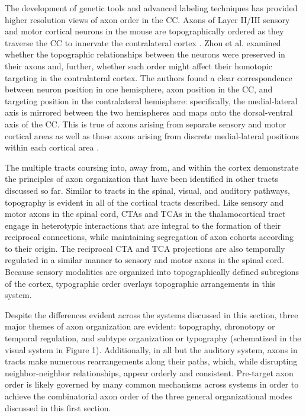 The development of genetic tools and advanced labeling techniques has provided higher resolution views of axon order in the CC. 
Axons of Layer II/III sensory and motor cortical neurons in the mouse are topographically ordered as they traverse the CC to innervate the contralateral cortex \cite{zhou2013axon}. 
Zhou et al. examined whether the topographic relationships between the neurons were preserved in their axons and, further, whether such order might affect their homotopic targeting in the contralateral cortex. 
The authors found a clear correspondence between neuron position in one hemisphere, axon position in the CC, and targeting position in the contralateral hemisphere: specifically, the medial-lateral axis is mirrored between the two hemispheres and maps onto the dorsal-ventral axis of the CC. 
This is true of axons arising from separate sensory and motor cortical areas as well as those axons arising from discrete medial-lateral positions within each cortical area \cite{zhou2013axon}. 

The multiple tracts coursing into, away from, and within the cortex demonstrate the principles of axon organization that have been identified in other tracts discussed so far. 
Similar to tracts in the spinal, visual, and auditory pathways, topography is evident in all of the cortical tracts described. 
Like sensory and motor axons in the spinal cord, CTAs and TCAs in the thalamocortical tract engage in heterotypic interactions that are integral to the formation of their reciprocal connections, while maintaining segregation of axon cohorts according to their origin. 
The reciprocal CTA and TCA projections are also temporally regulated in a similar manner to sensory and motor axons in the spinal cord. 
Because sensory modalities are organized into topographically defined subregions of the cortex, typographic order overlays topographic arrangements in this system. 

Despite the differences evident across the systems discussed in this section, three major themes of axon organization are evident: topography, chronotopy or temporal regulation, and subtype organization or typography (schematized in the visual system in Figure 1). 
Additionally, in all but the auditory system, axons in tracts make numerous rearrangements along their paths, which, while disrupting neighbor-neighbor relationships, appear orderly and consistent. 
Pre-target axon order is likely governed by many common mechanisms across systems in order to achieve the combinatorial axon order of the three general organizational modes discussed in this first section. 